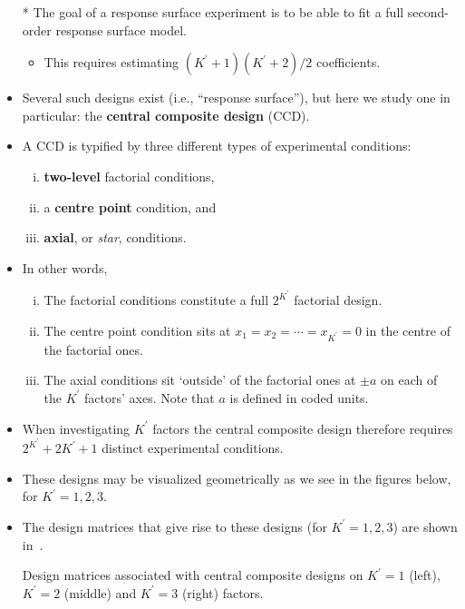 \begin{itemize}
    \item[*] The goal of a response surface experiment is to be able to fit a full second-order response surface model.
        \begin{itemize}
            \item This requires estimating $ (K^\prime+1)(K^\prime+2)/2 $ coefficients.
        \end{itemize}
    \item Several such designs exist (i.e., ``response surface''), but here we study one in particular: the \textbf{central composite design} (CCD).
    \item A CCD is typified by three different types of experimental conditions:
          \begin{enumerate}[i.]
              \item \textbf{two-level} factorial conditions,
              \item a \textbf{centre point} condition, and
              \item \textbf{axial}, or \emph{star}, conditions.
          \end{enumerate}
    \item In other words,
          \begin{enumerate}[i.]
              \item The factorial conditions constitute a full $ 2^{K^\prime} $ factorial design.
              \item The centre point condition sits at $ x_1=x_2=\cdots=x_{K^\prime}=0 $ in the centre of the factorial ones.
              \item The axial conditions sit `outside' of the factorial ones at $ \pm a $ on each of the $ K^\prime $ factors' axes. Note that $ a $ is defined in coded units.
          \end{enumerate}
    \item When investigating $ K^\prime $ factors the central composite design therefore requires $ 2^{K^\prime}+2K^\prime+1 $ distinct experimental conditions.
    \item These designs may be visualized geometrically as we see in the figures below, for $ K^\prime=1,2,3 $.
    \item The design matrices that give rise to these designs (for $ K^\prime=1,2,3 $) are shown in~.
          \begin{table}[!htbp]
              \centering
              \caption{Design matrices associated with central composite designs on $ K^\prime=1 $ (left), $ K^\prime=2 $ (middle) and $ K^\prime=3 $ (right) factors.}\label{tab:exampledesigns}

\end{table}
\end{itemize}

